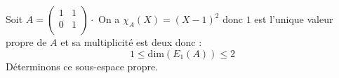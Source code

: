 \documentclass[a4paper,10pt]{report}
\begin{document}
\begin{ex} Soit $A = \begin{pmatrix}
1 & 1 \\
0 & 1 \\
\end{pmatrix} \cdot$
On a $\chi_A(X) = (X-1)^2$ donc $1$ est l'unique valeur propre  de $A$ et sa multiplicité est deux donc :
$$ 1 \leq \textrm{dim}(E_1(A)) \leq 2$$
Déterminons ce sous-espace propre. 

%
%
%

\vspace{7cm}
\end{ex}
\end{document}
